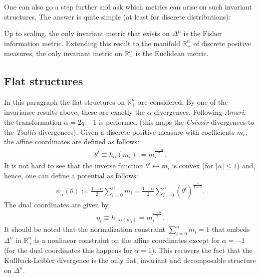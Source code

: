     One can also go a step further and ask which metrics can arise on such invariant structures. The answer is quite simple (at least for discrete distributions):
    \begin{theorem}[Chentsov]
        Up to scaling, the only invariant metric that exists on $\Delta^n$ is the Fisher information metric. Extending this result to the manifold $\mathbb{R}^n_+$ of discrete positive measures, the only invariant metric on $\mathbb{R}^n_+$ is the Euclidean metric.
    \end{theorem}

\subsection{Flat structures}

    In this paragraph the flat structures on $\mathbb{R}^n_+$ are considered. By one of the invariance results above, these are exactly the $\alpha$-divergences. Following \textit{Amari}, the transformation $\alpha=2q-1$ is performed (this maps the \textit{Csisz\'ar} divergences to the \textit{Tsallis} divergences). Given a discrete positive measure with coefficients $m_i$, the affine coordinates are defined as follows:
    \begin{gather}
        \theta^i \equiv h_\alpha(m_i) := m_i^{\frac{1-\alpha}{2}}.
    \end{gather}
    It is not hard to see that the inverse function $\theta^i\mapsto m_i$ is convex (for $|\alpha|\leq1$) and, hence, one can define a potential as follows:
    \begin{gather}
        \psi_\alpha(\theta) := \frac{1-\alpha}{2}\sum_{i=0}^n m_i = \frac{1-\alpha}{2}\sum_{i=0}^n \left(\theta^i\right)^{\frac{2}{1-\alpha}}.
    \end{gather}
    The dual coordinates are given by
    \begin{gather}
        \eta_i \equiv h_{-\alpha(m_i)} = m_i^{\frac{1+\alpha}{2}}.
    \end{gather}
    It should be noted that the normalization constraint $\sum_{i=0}^nm_i=1$ that embeds $\Delta^n$ in $\mathbb{R}^n_+$ is a nonlinear constraint on the affine coordinates except for $\alpha=-1$ (for the dual coordinates this happens for $\alpha=1$). This recovers the fact that the Kullback-Leibler divergence is the only flat, invariant and decomposable structure on $\Delta^n$.


